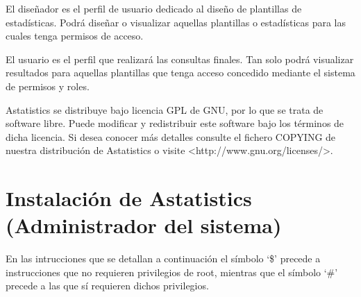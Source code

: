 \documentclass[spanish,12pt]{book}
\begin{document}
El diseñador es el perfil de usuario dedicado al diseño de plantillas de estadísticas. Podrá diseñar o visualizar aquellas plantillas o estadísticas para las cuales tenga permisos de acceso.

El usuario es el perfil que realizará las consultas finales. Tan solo podrá visualizar resultados para aquellas plantillas que tenga acceso concedido mediante el sistema de permisos y roles.

Astatistics se distribuye bajo licencia GPL de GNU, por lo que se trata de software libre. Puede modificar y redistribuir este software bajo los términos de dicha licencia. Si desea conocer más detalles consulte el fichero COPYING de nuestra distribución de Astatistics o visite {\textless}http://www.gnu.org/licenses/\textgreater.

\chapter{Instalación de Astatistics (Administrador del sistema)}
En las intrucciones que se detallan a continuación el símbolo `\$' precede a instrucciones que no requieren privilegios de root, mientras que el símbolo `\#' precede a las que sí requieren dichos privilegios.
\end{document}
